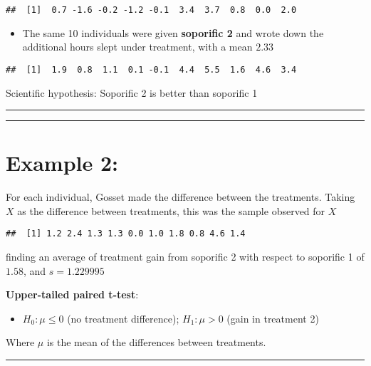 \documentclass[
]{book}
\providecommand{\tightlist}{%
  \setlength{\itemsep}{0pt}\setlength{\parskip}{0pt}}
\begin{document}
\begin{verbatim}
##  [1]  0.7 -1.6 -0.2 -1.2 -0.1  3.4  3.7  0.8  0.0  2.0
\end{verbatim}

\begin{itemize}
\tightlist
\item
  The same 10 individuals were given \textbf{soporific 2} and wrote down the additional hours slept under treatment, with a mean \(2.33\)
\end{itemize}

\begin{verbatim}
##  [1]  1.9  0.8  1.1  0.1 -0.1  4.4  5.5  1.6  4.6  3.4
\end{verbatim}

Scientific hypothesis: Soporific 2 is better than soporific 1

\begin{center}\rule{0.5\linewidth}{0.5pt}\end{center}

\begin{center}\rule{0.5\linewidth}{0.5pt}\end{center}

\hypertarget{example-2-4}{%
\section{Example 2:}\label{example-2-4}}

For each individual, Gosset made the difference between the treatments. Taking \(X\) as the difference between treatments, this was the sample observed for \(X\)

\begin{verbatim}
##  [1] 1.2 2.4 1.3 1.3 0.0 1.0 1.8 0.8 4.6 1.4
\end{verbatim}

finding an average of treatment gain from soporific 2 with respect to soporific 1 of \(1.58\), and \(s=1.229995\)

\textbf{Upper-tailed paired t-test}:

\begin{itemize}
\tightlist
\item
  \(H_0:\mu \leq 0\) (no treatment difference); \(H_1:\mu > 0\) (gain in treatment 2)
\end{itemize}

Where \(\mu\) is the mean of the differences between treatments.

\begin{center}\rule{0.5\linewidth}{0.5pt}\end{center}
\end{document}
